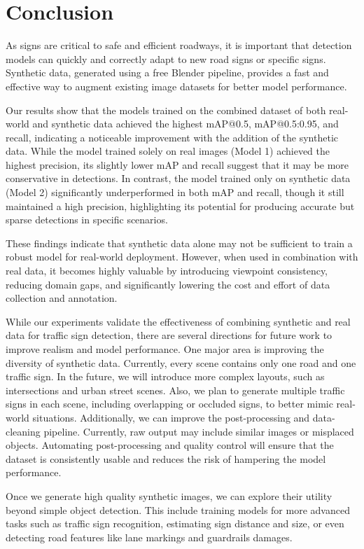 \documentclass[journal]{IEEEtran}
\begin{document}
\section{Conclusion}
As signs are critical to safe and efficient roadways, it is important that detection models can quickly and correctly adapt to new road signs or specific signs. Synthetic data, generated using a free Blender pipeline, provides a fast and effective way to augment existing image datasets for better model performance.

Our results show that the models trained on the combined dataset of both real-world and synthetic data achieved the highest mAP@0.5, mAP@0.5:0.95, and recall, indicating a noticeable improvement with the addition of the synthetic data. While the model trained solely on real images (Model 1) achieved the highest precision, its slightly lower mAP and recall suggest that it may be more conservative in detections. In contrast, the model trained only on synthetic data (Model 2) significantly underperformed in both mAP and recall, though it still maintained a high precision, highlighting its potential for producing accurate but sparse detections in specific scenarios.

These findings indicate that synthetic data alone may not be sufficient to train a robust model for real-world deployment. However, when used in combination with real data, it becomes highly valuable by introducing viewpoint consistency, reducing domain gaps, and significantly lowering the cost and effort of data collection and annotation.


While our experiments validate the effectiveness of combining synthetic and real data for traffic sign detection, there are several directions for future work to improve realism and model performance. One major area is improving the diversity of synthetic data. Currently, every scene contains only one road and one traffic sign. In the future, we will introduce more complex layouts, such as intersections and urban street scenes. Also, we plan to generate multiple traffic signs in each scene, including overlapping or occluded signs, to better mimic real-world situations. Additionally, we can improve the post-processing and data-cleaning pipeline. Currently, raw output may include similar images or misplaced objects. Automating post-processing and quality control will ensure that the dataset is consistently usable and reduces the risk of hampering the model performance.

Once we generate high quality synthetic images, we can explore their utility beyond simple object detection. This include training models for more advanced tasks such as traffic sign recognition, estimating sign distance and size, or even detecting road features like lane markings and guardrails damages. 
\end{document}
